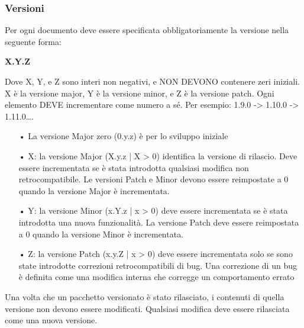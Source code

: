 \subsubsection{Versioni}
Per ogni documento deve essere specificata obbligatoriamente la versione nella seguente forma: 
\centerline{\textbf{X.Y.Z}}
Dove X, Y, e Z sono interi non negativi, e NON DEVONO contenere zeri iniziali. X è la versione major, Y è la versione minor, e Z è la versione patch. Ogni elemento DEVE incrementare come numero a sé. Per esempio: 1.9.0 -> 1.10.0 -> 1.11.0….

\begin{itemize}
\item[•]La versione Major zero (0.y.z) è per lo sviluppo iniziale
\item[•]X: la versione Major (X.y.z | X > 0) identifica la versione di rilascio. Deve essere incrementata se è stata introdotta qualsiasi modifica non retrocompatibile. Le versioni Patch e Minor devono essere reimpostate a 0 quando la versione Major è incrementata.
\item[•]Y: la versione Minor (x.Y.z | x > 0) deve essere incrementata se è stata introdotta una nuova funzionalità. La versione Patch deve essere reimpostata a 0 quando la versione Minor è incrementata.
\item[•] Z: la versione Patch (x.y.Z | x > 0) deve essere incrementata solo se sono state introdotte correzioni retrocompatibili di bug. Una correzione di un bug è definita come una modifica interna che corregge un comportamento errato
\end{itemize}
Una volta che un pacchetto versionato è stato rilasciato, i contenuti di quella versione non devono essere modificati. Qualsiasi modifica deve essere rilasciata come una nuova versione.

